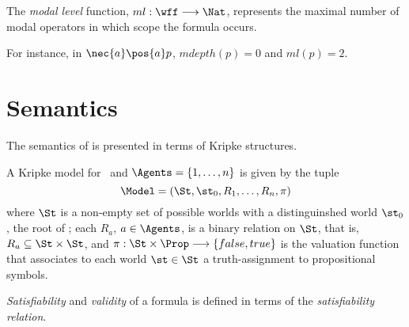 \begin{definition}
    The \emph{modal level} function, $ml : \wff \longrightarrow \Nat$,
    represents the maximal number of modal operators in which scope the formula
    occurs. 
\end{definition}

For instance, in $\nec{a}\pos{a} p$, $mdepth(p) = 0$ and $ml(p) = 2$.

\section{Semantics}
\label{semantics}

The semantics of  is presented in terms of Kripke structures.

\begin{definition}
    A Kripke model for \Prop~and $\Agents = \{1, \ldots, n\}$ is given by the tuple 
    \begin{equation}
        \Model = (\St, \st_0, R_1, \ldots, R_n, \pi)
    \end{equation}
    where $\St$ is a non-empty set of possible worlds with a distinguinshed world
    $\st_0$, the root of \Model; each $R_a$, $a \in \Agents$, is a binary relation
    on $\St$, that is, $R_a \subseteq \St \times \St$, and $\pi: \St \times \Prop
    \longrightarrow \{false, true\}$ is the valuation function that associates
    to each world $\st \in \St$ a truth-assignment to propositional symbols.
\end{definition}

\emph{Satisfiability} and \emph{validity} of a formula is defined in terms of the \emph{satisfiability relation}.


